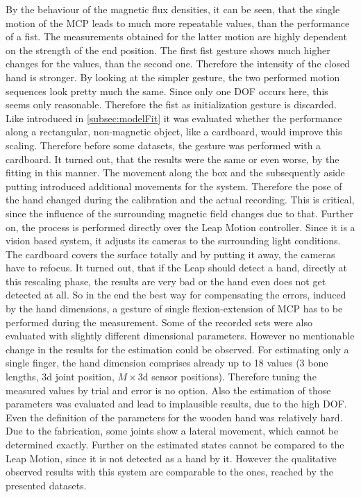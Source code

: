 By the behaviour of the magnetic flux densities, it can be seen, that the single motion of the \ac{MCP} leads to much more repeatable values, than the performance of a fist. The measurements obtained for the latter motion are highly dependent on the strength of the end position. The first fist gesture shows much higher changes for the values, than the second one. Therefore the intensity of the closed hand is stronger. By looking at the simpler gesture, the two performed motion sequences look pretty much the same. Since only one \ac{DOF} occurs here, this seems only reasonable. Therefore the fist as initialization gesture is discarded. Like introduced in \ref{subsec:modelFit} it was evaluated whether the performance along a rectangular, non-magnetic object, like a cardboard, would improve this scaling. Therefore before some datasets, the gesture was performed with a cardboard. It turned out, that the results were the same or even worse, by the fitting in this manner. The movement along the box and the subsequently aside putting introduced additional movements for the system. Therefore the pose of the hand changed during the calibration and the actual recording. This is critical, since the influence of the surrounding magnetic field changes due to that. Further on, the process is performed directly over the Leap Motion controller. Since it is a vision based system, it adjusts its cameras to the surrounding light conditions. The cardboard covers the surface totally and by putting it away, the cameras have to refocus. It turned out, that if the Leap should detect a hand, directly at this rescaling phase, the results are very bad or the hand even does not get detected at all. So in the end the best way for compensating the errors, induced by the hand dimensions, a gesture of single flexion-extension of \ac{MCP} has to be performed during the measurement. 
Some of the recorded sets were also evaluated with slightly different dimensional parameters. However no mentionable change in the results for the estimation could be observed. For estimating only a single finger, the hand dimension comprises already up to 18 values (3 bone lengths, 3d joint position, $ M \times $3d sensor positions). Therefore tuning the measured values by trial and error is no option. Also the estimation of those parameters was evaluated and lead to implausible results, due to the high \ac{DOF}. Even the definition of the parameters for the wooden hand was relatively hard. Due to the fabrication, some joints show a lateral movement, which cannot be determined exactly. Further on the estimated states cannot be compared to the Leap Motion, since it is not detected as a hand by it. However the qualitative observed results with this system are comparable to the ones, reached by the presented datasets. 

